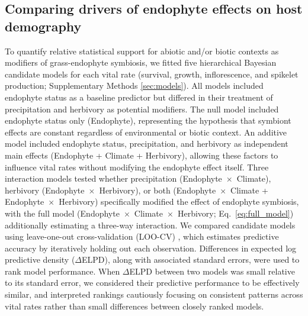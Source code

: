 \documentclass[12pt]{article}\usepackage[]{graphicx}\usepackage[dvipsnames]{xcolor}
\begin{document}
\subsection*{Comparing drivers of endophyte effects on host demography}
To quantify relative statistical support for abiotic and/or biotic contexts  as modifiers of grass-endophyte symbiosis, we fitted five hierarchical Bayesian  candidate models for each vital rate (survival, growth, inflorescence, and spikelet production; Supplementary Methods \ref{sec:models}).
All models included endophyte status as a baseline predictor but differed in their treatment of precipitation and herbivory as potential modifiers.
The null model included endophyte status only (Endophyte), representing the hypothesis that symbiont effects are constant regardless of environmental or biotic context.
An additive model included endophyte status, precipitation, and herbivory as independent main effects (Endophyte + Climate + Herbivory), allowing these factors to influence vital rates without modifying the endophyte effect itself.
Three interaction models tested whether precipitation (Endophyte~$\times$~Climate), herbivory (Endophyte~$\times$~Herbivory), or both (Endophyte~$\times$~Climate + Endophyte~$\times$~Herbivory) specifically modified the effect of endophyte symbiosis, with the full model (Endophyte~$\times$~Climate~$\times$~Herbivory; Eq.~\ref{eq:full_model}) additionally estimating a three-way interaction.
We compared candidate models using leave-one-out cross-validation (LOO-CV) \citep{vehtari2017practical}, which estimates predictive accuracy by iteratively holding out each observation.
Differences in expected log predictive density ($\Delta$ELPD), along with associated standard errors, were used to rank model performance.
When $\Delta$ELPD between two models was small relative to its standard error, we considered their predictive performance to be effectively similar, and interpreted rankings cautiously focusing on consistent patterns across vital rates rather than small differences between closely ranked models.
\end{document}
